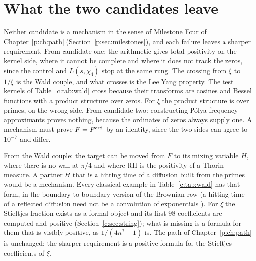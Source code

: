 \section{What the two candidates leave}\label{c:sec:verdict}

Neither candidate is a mechanism in the sense of Milestone Four of Chapter~\ref{p:ch:path} (Section~\ref{p:sec:milestones}), and each failure leaves a sharper requirement. From candidate one: the arithmetic gives total positivity on the kernel side, where it cannot be complete and where it does not track the zeros, since the control and $L(s,\chi_4)$ stop at the same rung. The crossing from $\xi$ to $1/\xi$ is the Wald couple, and what crosses is the Lee Yang property. The test kernels of Table~\ref{c:tab:wald} cross because their transforms are cosines and Bessel functions with a product structure over zeros. For $\xi$ the product structure is over primes, on the wrong side. From candidate two: constructing P\'olya frequency approximants proves nothing, because the ordinates of zeros always supply one. A mechanism must prove $F=F^{\rm ord}$ by an identity, since the two sides can agree to $10^{-7}$ and differ.

From the Wald couple: the target can be moved from $F$ to its mixing variable $H$, where there is no wall at $\pi/4$ and where RH is the positivity of a Thorin measure. A partner $H$ that is a hitting time of a diffusion built from the primes would be a mechanism. Every classical example in Table~\ref{c:tab:wald} has that form, in the boundary to boundary version of the Brownian row (a hitting time of a reflected diffusion need not be a convolution of exponentials \cite{Kent80}). For $\xi$ the Stieltjes fraction exists as a formal object and its first $98$ coefficients are computed and positive (Section~\ref{c:sec:string}); what is missing is a formula for them that is visibly positive, as $1/(4n^2-1)$ is. The path of Chapter~\ref{p:ch:path} is unchanged: the sharper requirement is a positive formula for the Stieltjes coefficients of $\xi$.


